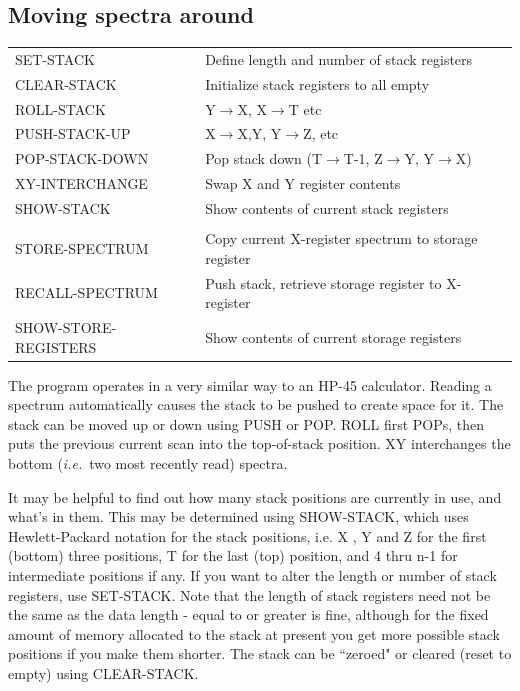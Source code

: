 \documentclass[11pt,twoside]{report}
\newcommand{\ie}{{\it i.e.\,}}
\begin{document}
\subsection{Moving spectra around}

\begin{tabular}{ll}
SET-STACK              & Define length and number of stack registers\\
CLEAR-STACK            & Initialize stack registers to all empty\\
ROLL-STACK             & Y$\rightarrow$X, X$\rightarrow$T etc\\
PUSH-STACK-UP          & X$\rightarrow$X,Y, Y$\rightarrow$Z, etc\\
POP-STACK-DOWN         & \parbox[t]{4.5in}{
                         Pop stack down (T$\rightarrow$T-1, Z$\rightarrow$Y, 
                         Y$\rightarrow$X)}\\
XY-INTERCHANGE         & Swap X and Y register contents\\
SHOW-STACK             & Show contents of current stack registers\\
\\
STORE-SPECTRUM         & Copy current X-register spectrum to storage register\\
RECALL-SPECTRUM        & Push stack, retrieve storage register to X-register\\
SHOW-STORE-REGISTERS   & Show contents of current storage registers\\
\end{tabular}

The program operates in a very similar way to an HP-45
calculator. Reading a spectrum automatically causes
the stack to be pushed to create space for it. The stack can be
moved up or down using PUSH or POP. ROLL first POPs, then puts the previous
current scan into the top-of-stack position. XY interchanges the bottom (\ie
two most recently read) spectra. 

It may be helpful to find out how many stack positions are currently in use,
and what's in them. This may be determined using SHOW-STACK, which uses
Hewlett-Packard notation for the stack positions, i.e. X
,
Y
and Z 
for the first (bottom) three positions, T for the last
(top) position, and 4 thru n-1 for intermediate positions if any. If you want
to alter the length or number of stack registers, use SET-STACK. Note that the
length of stack registers need not be the same
as the data length - equal to or greater is fine, although for the fixed amount
of memory allocated to the stack at present you get more possible stack
positions if you make them shorter. The stack can be ``zeroed" or cleared
(reset to empty) using CLEAR-STACK. 
\end{document}
